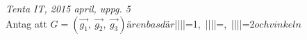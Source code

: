 {\it Tenta IT, 2015 april, uppg. 5}\\
Antag att $G=(\vec{g_1},\ \vec{g_2},\ \vec{g_3}) är en bas där $||||=1,\ ||||=,\ ||||=2$ och vinkeln $\angle